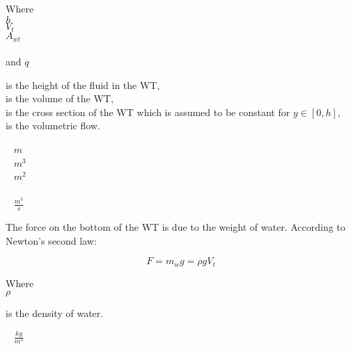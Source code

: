\begin{minipage}[t]{0.20\textwidth}
Where\\
\hspace*{8mm} $h$ \\
\hspace*{8mm} $V_t$ \\
\hspace*{8mm} $A_{wt}$ \\
\hspace*{8mm} \\
and \hspace*{0.7mm} $q$ \\
\end{minipage}
\begin{minipage}[t]{0.68\textwidth}
\vspace*{2mm}
is the height of the fluid in the WT,\\
is the volume of the WT,\\
is the cross section of the WT which is assumed to be constant for $y \in [0,h]$,\\
is the volumetric flow.
\end{minipage}
\begin{minipage}[t]{0.10\textwidth}
\vspace*{2mm}
\textcolor{White}{te}$\unit{m}$\\
\textcolor{White}{te}$\unit{m^3}$\\
\textcolor{White}{te}$\unit{m^2}$\\
\textcolor{White}{te}\\
\textcolor{White}{te}$\unit{\frac{m^3}{s}}$
\end{minipage}

The force on the bottom of the WT is due to the weight of water. According to Newton's second law: 

\begin{equation}
  F = m_wg = \rho g V_t
  \label{Newton_WT}
\end{equation}

  \begin{minipage}[t]{0.20\textwidth}
Where\\
\hspace*{8mm} $\rho$ 
\end{minipage}
\begin{minipage}[t]{0.68\textwidth}
\vspace*{2mm}
is the density of water.
\end{minipage}
\begin{minipage}[t]{0.10\textwidth}
\vspace*{2mm}
\textcolor{White}{te}$\unit{\frac{kg}{m^3}}$
\end{minipage}


